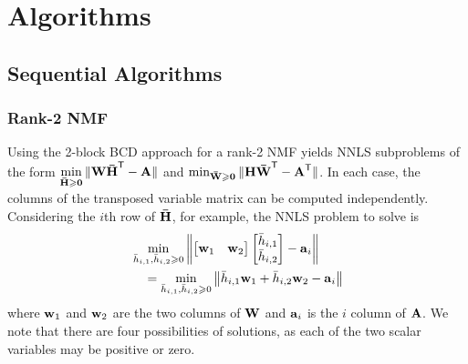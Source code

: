 \documentclass[conference,compsoc]{IEEEtran}
\begin{document}
\section{Algorithms}

\subsection{Sequential Algorithms}
\label{sec:seqalgs}

\subsubsection{Rank-2 NMF}
\label{sec:r2nmf}

Using the 2-block BCD approach for a rank-2 NMF yields NNLS subproblems of the form $\displaystyle \min_{\M[\bar]{H} \geq \M{0}} \|\M{W}\M[\bar]{H}^\Tra-\M{A}\|$ and $\min_{\M[\bar]{W} \geq \M{0}} \|\M{H}\M[\bar]{W}^\Tra-\M{A}^\Tra\|$.
In each case, the columns of the transposed variable matrix can be computed independently.
Considering the $i$th row of $\M[\bar]{H}$, for example, the NNLS problem to solve is
\begin{align*}
\begin{multlined}
\min_{\ME[\bar]{H}{i,1},\ME[\bar]{H}{i,2} \geq 0} \left\|\begin{bmatrix} \V{w}_1 & \V{w}_2 \end{bmatrix} \begin{bmatrix}\ME[\bar]{H}{i,1} \\ \ME[\bar]{H}{i,2} \end{bmatrix} - \V{A}_i \right\| \\ = \min_{\ME[\bar]{H}{i,1},\ME[\bar]{H}{i,2} \geq 0} \left\|\ME[\bar]{H}{i,1} \V{w}_1 + \ME[\bar]{H}{i,2} \V{w}_2 - \V{a}_i \right\|
\end{multlined}
\end{align*}
where $\V{w}_1$ and $\V{W}_2$ are the two columns of $\M{W}$ and $\V{a}_i$ is the $i$ column of $\M{A}$.
We note that there are four possibilities of solutions, as each of the two scalar variables may be positive or zero.
\end{document}
